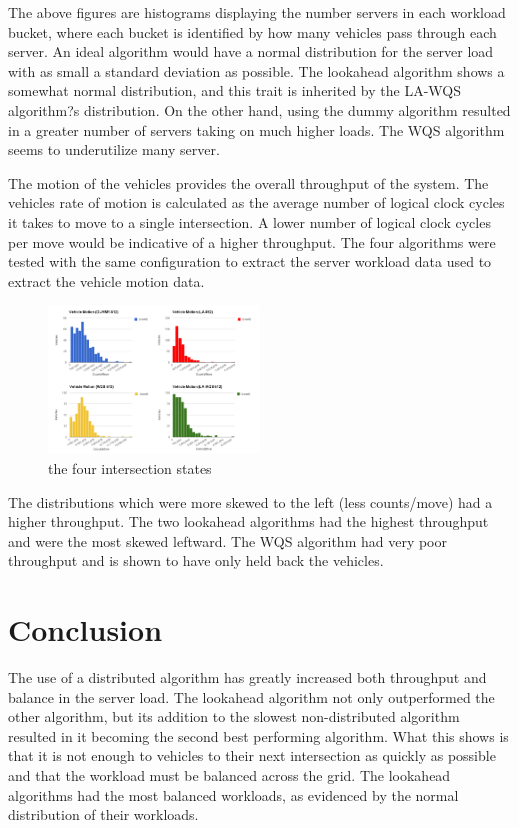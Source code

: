 \documentclass[conference]{IEEEtran}
\begin{document}
The above figures are histograms displaying the number servers in each workload bucket, where each bucket is identified by how many vehicles pass through each server. An ideal algorithm would have a normal distribution for the server load with as small a standard deviation as possible. The lookahead algorithm shows a somewhat normal distribution, and this trait is inherited by the LA-WQS algorithm?s distribution. On the other hand, using the dummy algorithm resulted in a greater number of servers taking on much higher loads. The WQS algorithm seems to underutilize many server.

The motion of the vehicles provides the overall throughput of the system. The vehicles rate of motion is calculated as the average number of logical clock cycles it takes to move to a single intersection. A lower number of logical clock cycles per move would be indicative of a higher throughput. The four algorithms were tested with the same configuration to extract the server workload data used to extract the vehicle motion data.


\begin{figure}[h]
    \center    
    \includegraphics[width=0.5\textwidth]{images/vehicle_motion.png}
	\caption{the four intersection states}
	\label{intersection_states}
\end{figure}


The distributions which were more skewed to the left (less counts/move) had a higher throughput. The two lookahead algorithms had the highest throughput and were the most skewed leftward. The WQS algorithm had very poor throughput and is shown to have only held back the vehicles.

\section{Conclusion}
The use of a distributed algorithm has greatly increased both throughput and balance in the server load. The lookahead algorithm not only outperformed the other algorithm, but its addition to the slowest non-distributed algorithm resulted in it becoming the second best performing algorithm. What this shows is that it is not enough to vehicles to their next intersection as quickly as possible and that the workload must be balanced across the grid. The lookahead algorithms had the most balanced workloads, as evidenced by the normal distribution of their workloads.
\end{document}
